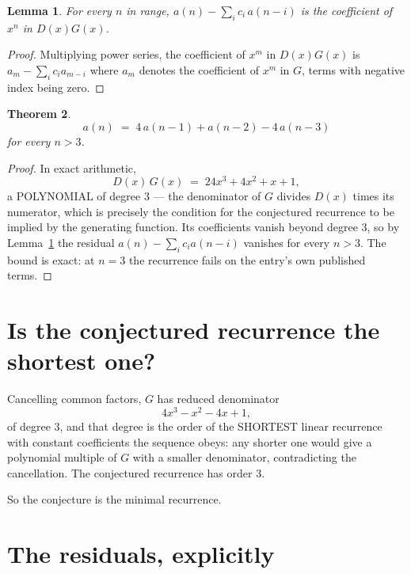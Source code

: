 \documentclass[11pt,a4paper]{article}
\theoremstyle{plain}
\newtheorem{theorem}{Theorem}
\newtheorem{lemma}[theorem]{Lemma}
\theoremstyle{definition}
\begin{document}
\begin{lemma}\label{lem:key}
For every $n$ in range, $a(n)-\sum_i c_i\,a(n-i)$ is the coefficient of $x^{n}$ in
$D(x)G(x)$.
\end{lemma}

\begin{proof}
Multiplying power series, the coefficient of $x^{m}$ in $D(x)G(x)$ is
$a_m-\sum_i c_i a_{m-i}$ where $a_m$ denotes the coefficient of $x^{m}$ in $G$, terms with
negative index being zero.
\end{proof}

\begin{theorem}
\[
a(n)\;=\;4\,a(n-1) + a(n-2) - 4\,a(n-3)
\]
for every $n>3$.
\end{theorem}

\begin{proof}
In exact arithmetic,
\[
D(x)\,G(x)\;=\;24 x^{3} + 4 x^{2} + x + 1,
\]
a POLYNOMIAL of degree $3$ --- the denominator of $G$ divides $D(x)$ times its numerator,
which is precisely the condition for the conjectured recurrence to be implied by the
generating function. Its coefficients vanish beyond degree $3$, so by
Lemma~\ref{lem:key} the residual $a(n)-\sum_ic_ia(n-i)$ vanishes for every
$n>3$. The bound is exact: at $n=3$ the recurrence fails on the entry's own published terms.
\end{proof}

\section{Is the conjectured recurrence the shortest one?}

Cancelling common factors, $G$ has reduced denominator
\[
4 x^{3} - x^{2} - 4 x + 1,
\]
of degree $3$, and that degree is the order of the SHORTEST linear recurrence with
constant coefficients the sequence obeys: any shorter one would give a polynomial multiple of
$G$ with a smaller denominator, contradicting the cancellation. The conjectured recurrence has
order $3$.

So the conjecture is the minimal recurrence.

\section{The residuals, explicitly}
\end{document}
